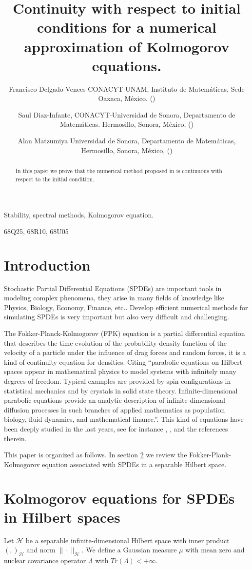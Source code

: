 \documentclass[review, onefignum, onetabnum]{siamart171218}
\title{%
    Continuity with respect to initial conditions for a numerical 
    approximation of Kolmogorov equations.
}
\author{
    Francisco Delgado-Vences
    CONACYT-UNAM, 
    Instituto de Matem\'aticas, 
    Sede Oaxaca, M\'exico.
    (\email{delgado@im.unam.mx})
%    
    \and
    Saul Diaz-Infante,
    CONACYT-Universidad 
    de Sonora, Departamento de Matem\'aticas. 
    Hermosillo, Sonora, M\'exico,
    (\email{saul.diazinfante@unison.mx})
%
    \and
    Alan Matzumiya
    Universidad de Sonora, 
    Departamento de Matem\'aticas,
    Hermosillo, Sonora, M\'exico,
    (\email{alan.matzumiya@gmail.com})
}
\begin{document}
\maketitle

\begin{abstract}
    In this paper we prove that the numerical method proposed in \cite{de-fl}
    is continuous with respect to the initial condition. 
\end{abstract}

\begin{keywords}
    Stability, spectral methods, Kolmogorov equation.
\end{keywords}

\begin{AMS}
  68Q25, 68R10, 68U05
\end{AMS}

\section{Introduction}
    Stochastic Partial Differential Equations (SPDEs) are important tools in
modeling complex phenomena, they arise in many fields of knowledge like
Physics, Biology, Economy, Finance, etc.. Develop efficient numerical
methods for simulating SPDEs is very important but also very difficult and
challenging.

    The  Fokker-Planck-Kolmogorov (FPK) equation is a partial differential 
equation that describes the time evolution of the probability density function
of the velocity of a particle under the influence of drag forces and random
forces, it is a kind of continuity equation for densities. Citing \cite{da-za}
``parabolic equations on Hilbert spaces appear in mathematical physics to model
systems with infinitely many degrees of freedom. Typical examples are provided
by spin configurations in statistical mechanics and by crystals in solid state
theory. Infinite-dimensional parabolic equations provide an analytic description
of infinite dimensional diffusion processes in such branches of applied
mathematics as population biology, fluid dynamics, and mathematical finance.''.
This kind of equations have been deeply studied in the last years, see for
instance \cite{bo-da-ro}, \cite{da-fl-ro}, \cite{da} and the references therein.

    This paper is organized as follows. In section \ref{fpk-sect} we review the 
Fokker-Plank-Kolmogorov equation associated with SPDEs in
a separable Hilbert space. 

\section{Kolmogorov equations for SPDEs in Hilbert spaces}\label{fpk-sect}
    Let $\mathcal{H}$ be a separable infinite-dimensional Hilbert space with 
inner product $( ,  )_\mathcal{H} $ and norm $\|\cdot\|_\mathcal{H}$. We define 
a Gaussian measure $\mu$ with mean zero and nuclear covariance operator 
$\Lambda$ with  $Tr(\Lambda)<+\infty$.
\end{document}
